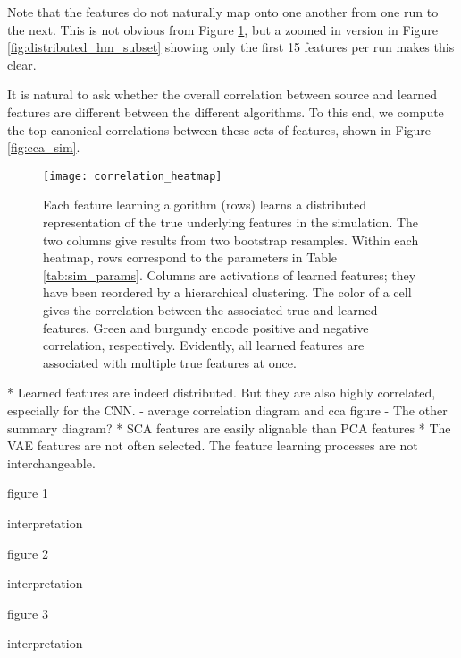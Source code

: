 Note that the features do not naturally map onto one another from one run to the
next. This is not obvious from Figure \ref{fig:distributed_hm}, but a zoomed in
version in Figure \ref{fig:distributed_hm_subset} showing only the first 15
features per run makes this clear.

It is natural to ask whether the overall correlation between source and learned
features are different between the different algorithms. To this end, we compute
the top canonical correlations between these sets of features, shown in Figure
\ref{fig:cca_sim}.

\begin{figure}
  \centering
  \texttt{[image: correlation\_heatmap]}
  \caption{Each feature learning algorithm (rows) learns a distributed
    representation of the true underlying features in the simulation. The two
    columns give results from two bootstrap resamples. Within each heatmap, rows
    correspond to the parameters in Table \ref{tab:sim_params}. Columns are
    activations of learned features; they have been reordered by a hierarchical
    clustering. The color of a cell gives the correlation between the associated
    true and learned features. Green and burgundy encode positive and negative
    correlation, respectively. Evidently, all learned features are associated
    with multiple true features at once.}
  \label{fig:distributed_hm}
\end{figure}

* Learned features are indeed distributed. But they are also highly correlated,
especially for the CNN.
  - average correlation diagram and cca figure
  - The other summary diagram?
* SCA features are easily alignable than PCA features
* The VAE features are not often selected. The feature learning processes are
not interchangeable.

figure 1

interpretation

figure 2

interpretation

figure 3

interpretation
